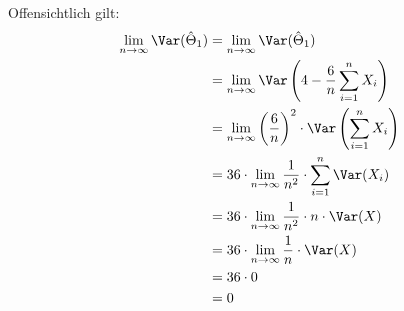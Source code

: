 \documentclass{abgabe}
\begin{document}
\begin{questions}
\begin{parts}
\begin{solution}
            Offensichtlich gilt: 
            \begin{alignat*}{1}
                \lim_{n\to\infty}\Var(\hat{\Theta}_1) & = \lim_{n\to\infty}\Var(\hat{\Theta}_1)                                                    \\ 
                                                      & = \lim_{n\to\infty}\Var\left(4 - \frac{6}{n} \sum_{i=1}^{n} X_i\right)                     \\ 
                                                      & = \lim_{n\to\infty}\left( \frac{6}{n} \right)^2 \cdot \Var\left( \sum_{i=1}^{n} X_i\right) \\ 
                                                      & = 36 \cdot \lim_{n\to\infty}\frac{1}{n^2} \cdot \sum_{i=1}^{n} \Var (X_i)                  \\ 
                                                      & = 36 \cdot \lim_{n\to\infty}\frac{1}{n^2} \cdot  n \cdot  \Var (X)                         \\ 
                                                      & = 36 \cdot \lim_{n\to\infty}\frac{1}{n} \cdot  \Var (X)                                    \\ 
                                                      & = 36 \cdot 0                                                                               \\ 
                                                      & = 0
            \end{alignat*}
            
        \end{solution}
    \end{parts}
\end{questions}
\end{document}
